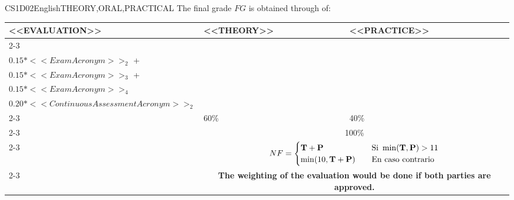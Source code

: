   \begin{evaluation}{CS1D02}{English}{THEORY,ORAL,PRACTICAL}
  The final grade $FG$ is obtained through of:

  \begin{tabularx}{0.9\textwidth}{|X|p{}|p{}|} \hline
    \multirow{4}{*}{\uppercase{<<Evaluation>>}} & \uppercase{<<Theory>>} & \uppercase{<<Practice>>} \\ \cline{2-3}
    & %
        \begin{minipage}{0.95\textwidth}
        \begin{tabular}{l}
            $\text{\textbf{T}} = 0.15*<<ExamAcronym>>_{1}$  + \\
            $0.15*<<ExamAcronym>>_{2}$  + \\
            $0.15*<<ExamAcronym>>_{3}$  + \\
            $0.15*<<ExamAcronym>>_{4}$
            \end{tabular}
        \end{minipage}
    & %
        \begin{minipage}{0.95\textwidth}
        \begin{tabular}{l}
            $\text{\textbf{P}} = 0.20*<<ContinuousAssessmentAcronym>>_{1}$ + \\
            $0.20*<<ContinuousAssessmentAcronym>>_{2}$
        \end{tabular}
        \end{minipage}                 \\ \cline{2-3}
  
    & %
    60\% 
    & %
    40\% \\ \cline{2-3}
    & \multicolumn{2}{c|}{100\%}  \\ \cline{2-3}
    & \multicolumn{2}{c|}{
      \begin{math}
        NF =
        \begin{cases}
          \text{\textbf{T}} + \text{\textbf{P}}  & \quad \text{Si } \min(\text{\textbf{T}},\text{\textbf{P}}) > 11  \\
          \min(10,\text{\textbf{T}} + \text{\textbf{P}})     & \quad \text{En caso contrario}
        \end{cases}
      \end{math}
    } \\ \cline{2-3}
    & \multicolumn{2}{c|}{\textbf{The weighting of the evaluation would be done if both parties are approved.}}  \\ \hline
    \end{tabularx}
      

\end{evaluation}
